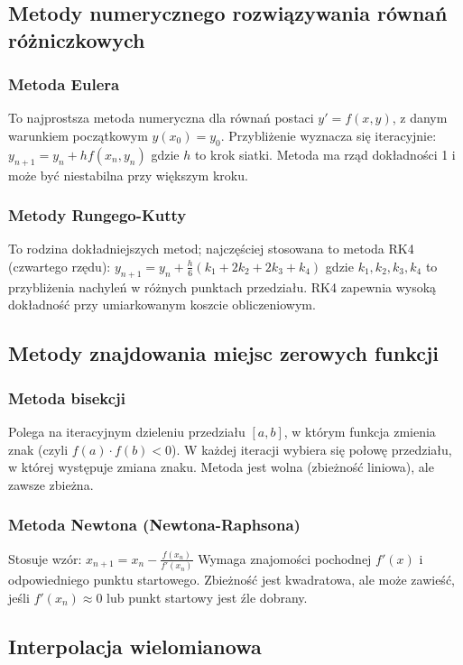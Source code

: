 \subsection{Metody numerycznego rozwiązywania równań różniczkowych}
\subsubsection*{Metoda Eulera}
To najprostsza metoda numeryczna dla równań postaci $y' = f(x, y)$, z danym warunkiem początkowym $y(x_0) = y_0$. Przybliżenie wyznacza się iteracyjnie:
$y_{n+1} = y_n + h f(x_n, y_n)$
gdzie $h$ to krok siatki. Metoda ma rząd dokładności 1 i może być niestabilna przy większym kroku.

\subsubsection*{Metody Rungego-Kutty}
To rodzina dokładniejszych metod; najczęściej stosowana to metoda RK4 (czwartego rzędu):
$y_{n+1} = y_n + \frac{h}{6}(k_1 + 2k_2 + 2k_3 + k_4)$
gdzie $k_1, k_2, k_3, k_4$ to przybliżenia nachyleń w różnych punktach przedziału. RK4 zapewnia wysoką dokładność przy umiarkowanym koszcie obliczeniowym.

\subsection{Metody znajdowania miejsc zerowych funkcji}
\subsubsection*{Metoda bisekcji}
Polega na iteracyjnym dzieleniu przedziału $[a, b]$, w którym funkcja zmienia znak (czyli $f(a) \cdot f(b) < 0$). W każdej iteracji wybiera się połowę przedziału, w której występuje zmiana znaku. Metoda jest wolna (zbieżność liniowa), ale zawsze zbieżna.

\subsubsection*{Metoda Newtona (Newtona-Raphsona)}
Stosuje wzór:
$x_{n+1} = x_n - \frac{f(x_n)}{f'(x_n)}$
Wymaga znajomości pochodnej $f'(x)$ i odpowiedniego punktu startowego. Zbieżność jest kwadratowa, ale może zawieść, jeśli $f'(x_n) \approx 0$ lub punkt startowy jest źle dobrany.

\subsection{Interpolacja wielomianowa}
